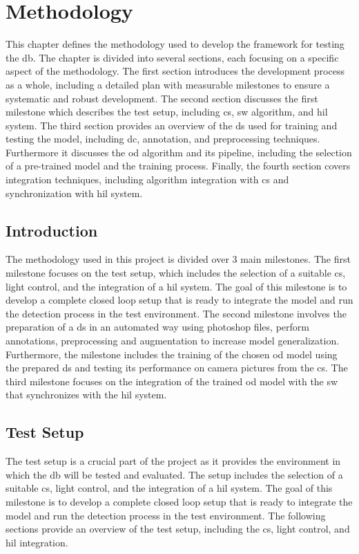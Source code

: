 

\chapter{Methodology} \label{ch:methodology}
This chapter defines the methodology used to develop the framework for testing the \gls{db}. The chapter is divided into several sections, each focusing on a specific aspect of the methodology. The first section introduces the development process as a whole, including a detailed plan with measurable milestones to ensure a systematic and robust development. The  second section discusses the first milestone which describes the test setup, including \gls{cs}, \gls{sw} algorithm, and \gls{hil} system. The third section provides an overview of the \gls{ds} used for training and testing the model, including \gls{dc}, annotation, and preprocessing techniques. Furthermore it discusses the \gls{od} algorithm and its pipeline, including the selection of a pre-trained model and the training process. Finally, the fourth section covers integration techniques, including algorithm integration with \gls{cs} and synchronization with \gls{hil} system.

\section{Introduction}
The methodology used in this project is divided over 3 main milestones. The first milestone focuses on the test setup, which includes the selection of a suitable \gls{cs}, light control, and the integration of a \gls{hil} system. The goal of this milestone is to develop a complete closed loop setup that is ready to integrate the model and run the detection process in the test environment. The second milestone involves the preparation of a \gls{ds} in an automated way using photoshop files, perform annotations, preprocessing and augmentation to increase model generalization. Furthermore, the  milestone includes the training of the chosen \gls{od} model using the prepared \gls{ds} and testing its performance on camera pictures from the \gls{cs}. The third milestone focuses on the integration of the trained \gls{od} model with the \gls{sw} that synchronizes with the \gls{hil} system.

\section{Test Setup}
The test setup is a crucial part of the project as it provides the environment in which the \gls{db} will be tested and evaluated. The setup includes the selection of a suitable \gls{cs}, light control, and the integration of a \gls{hil} system. The goal of this milestone is to develop a complete closed loop setup that is ready to integrate the model and run the detection process in the test environment. The following sections provide an overview of the test setup, including the \gls{cs}, light control, and \gls{hil} integration.

